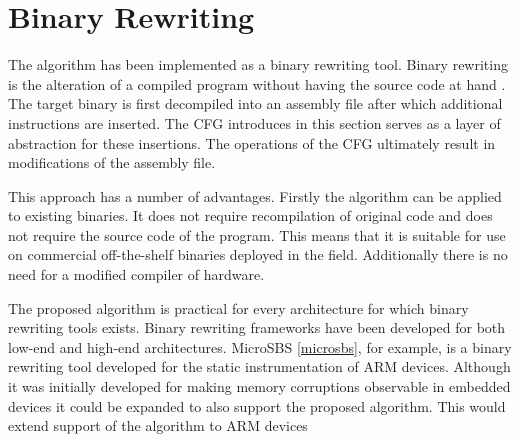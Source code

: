 \section{Binary Rewriting}
\label{sec:rewriting}
The algorithm has been implemented as a binary rewriting tool. 
Binary rewriting is the alteration of a compiled program without having the source code at hand \cite{rewriting-survey}.
The target binary is first decompiled into an assembly file after which additional instructions are inserted. 
The CFG introduces in this section serves as a layer of abstraction for these insertions. 
The operations of the CFG ultimately result in modifications of the assembly file. 
 
This approach has a number of advantages. 
Firstly the algorithm can be applied to existing binaries. It does not require recompilation of original code and does not require the source code of the program. 
This means that it is suitable for use on commercial off-the-shelf binaries deployed in the field. 
Additionally there is no need for a modified compiler of hardware. 

The proposed algorithm is practical for every architecture for which binary rewriting tools exists. Binary rewriting frameworks have been developed for both low-end and high-end architectures. 
MicroSBS \ref{microsbs}, for example, is a binary rewriting tool developed for the static instrumentation of ARM devices. Although it was initially developed for making memory corruptions observable in embedded devices it 
could be expanded to also support the proposed algorithm. This would extend support of the algorithm to ARM  devices